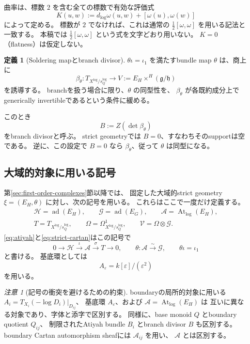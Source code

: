 \documentclass[uplatex,dvipdfmx,11pt]{jsarticle}
\numberwithin{equation}{section}
\theoremstyle{plain}
\theoremstyle{definition}
\newtheorem{definition}[theorem]{定義}
\theoremstyle{remark}
\newtheorem{remark}[theorem]{注意}
\DeclareMathOperator{\At}{At}
\DeclareMathOperator{\ad}{ad}
\newcommand{\g}{\mathfrak g}
\newcommand{\h}{\mathfrak h}
\newcommand{\Tlog}{T_{X^{\log}/s_Q^{\log}}}
\newcommand{\Omlog}{\Omega^1_{X^{\log}/s_Q^{\log}}}
\newcommand{\Atlog}{\At_{\log}}
\newcommand{\shH}{\mathcal H}
\newcommand{\shG}{\mathcal G}
\newcommand{\shA}{\mathcal A}
\newcommand{\shV}{\mathcal V}
\newcommand{\Aeps}{A_\varepsilon}
\begin{document}
曲率は、標数 \(2\) を含む全ての標数で有効な評価式
\begin{equation}
\label{eq:curvature-eval}
K(u,w):=d_{\log}\omega(u,w)+[\omega(u),\omega(w)]
\end{equation}
によって定める。
標数が \(2\) でなければ、これは通常の \(\tfrac12[\omega,\omega]\) を用いる記法と一致する。
本稿では \(\tfrac12[\omega,\omega]\) という式を文字どおり用いない。
\(K=0\)（flatness）は仮定しない。

\begin{definition}[Soldering mapとbranch divisor]
\label{def:branch}
\(\theta\iota=\iota_1\) を満たすbundle map \(\theta\) は、商上に
\[
\beta_\theta:\Tlog\longrightarrow
V:=E_H\times^H(\g/\h)
\]
を誘導する。
branchを扱う場合に限り、\(\theta\) の同型性を、
\(\beta_\theta\) が各既約成分上でgenerically invertibleであるという条件に緩める。

このとき
\[
B:=Z(\det\beta_\theta)
\]
をbranch divisorと呼ぶ。
strict geometryでは \(B=0\)、すなわちそのsupportは空である。
逆に、この設定で \(B=0\) なら \(\beta_\theta\)、従って \(\theta\) は同型になる。
\end{definition}

\subsection{大域的対象に用いる記号}
\label{subsec:notation}

第\ref{sec:first-order-complexes}節以降では、
固定した大域的strict geometry \(\xi=(E_H,\theta)\) に対し、次の記号を用いる。
これらはここで一度だけ定義する。
\begin{equation}
\label{eq:locked-notation}
\begin{gathered}
\shH=\ad(E_H),\qquad
\shG=\ad(E_G),\qquad
\shA=\Atlog(E_H),\\[2pt]
T=\Tlog,\qquad
\Omega=\Omlog,\qquad
\shV=\Omega\otimes\shG .
\end{gathered}
\end{equation}
\eqref{eq:atiyah}と\eqref{eq:strict-cartan}はこの記号で
\[
0\to\shH\xrightarrow{\iota}\shA\xrightarrow{\sigma}T\to0,
\qquad
\theta:\shA\xrightarrow{\sim}\shG,
\qquad
\theta\iota=\iota_1
\]
と書ける。
基底環としては
\[
\Aeps=k[\varepsilon]/(\varepsilon^2)
\]
を用いる。

\begin{remark}[記号の衝突を避けるための約束]
\label{rem:notation-clash}
boundaryの局所的対象に用いる \(A_i=T_{X_i}(-\log D_i)|_{D_{ij}}\)、
基底環 \(\Aeps\)、および \(\shA=\Atlog(E_H)\) は
互いに異なる対象であり、字体と添字で区別する。
同様に、base monoid \(Q\) とboundary quotient \(Q_{ij}\)、
制限されたAtiyah bundle \(B_i\) とbranch divisor \(B\) も区別する。
boundary Cartan automorphism sheafには \(\mathscr A_{ij}\) を用い、
\(\shA\) とは区別する。
\end{remark}
\end{document}
